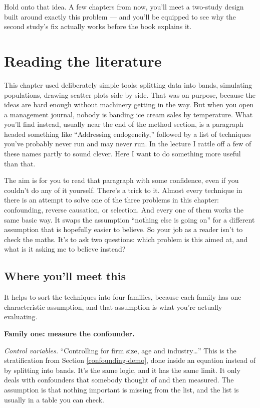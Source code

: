 \documentclass[
]{book}
\begin{document}
Hold onto that idea. A few chapters from now, you'll meet a two-study design built around exactly this problem --- and you'll be equipped to see why the second study's fix actually works before the book explains it.

\section{Reading the literature}\label{causation-reading}

This chapter used deliberately simple tools: splitting data into bands, simulating populations, drawing scatter plots side by side. That was on purpose, because the ideas are hard enough without machinery getting in the way. But when you open a management journal, nobody is banding ice cream sales by temperature. What you'll find instead, usually near the end of the method section, is a paragraph headed something like ``Addressing endogeneity,'' followed by a list of techniques you've probably never run and may never run. In the lecture I rattle off a few of these names partly to sound clever. Here I want to do something more useful than that.

The aim is for you to read that paragraph with some confidence, even if you couldn't do any of it yourself. There's a trick to it. Almost every technique in there is an attempt to solve one of the three problems in this chapter: confounding, reverse causation, or selection. And every one of them works the same basic way. It swaps the assumption ``nothing else is going on'' for a different assumption that is hopefully easier to believe. So your job as a reader isn't to check the maths. It's to ask two questions: which problem is this aimed at, and what is it asking me to believe instead?

\subsection{Where you'll meet this}\label{where-youll-meet-this-2}

It helps to sort the techniques into four families, because each family has one characteristic assumption, and that assumption is what you're actually evaluating.

\textbf{Family one: measure the confounder.}

\emph{Control variables.} ``Controlling for firm size, age and industry\ldots{}'' This is the stratification from Section \ref{confounding-demo}, done inside an equation instead of by splitting into bands. It's the same logic, and it has the same limit. It only deals with confounders that somebody thought of and then measured. The assumption is that nothing important is missing from the list, and the list is usually in a table you can check.
\end{document}
